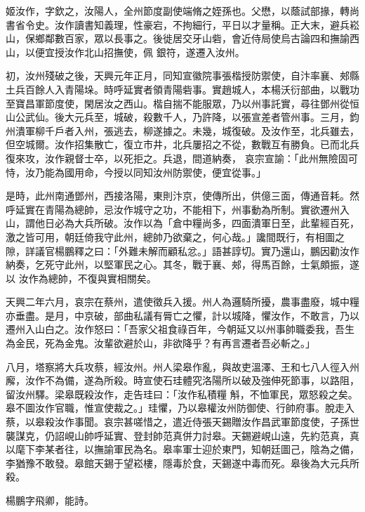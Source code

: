 \begin{pinyinscope}
 姬汝作，字欽之，汝陽人，全州節度副使端脩之姪孫也。父懋，以蔭試部掾，轉尚書省令史。汝作讀書知義理，性豪宕，不拘細行，平日以才量稱。正大末，避兵崧山，保鄉鄰數百家，眾以長事之。後徙居交牙山砦，會近侍局使烏古論四和撫諭西山，以便宜授汝作北山招撫使，佩
 銀符，遂遷入汝州。



 初，汝州殘破之後，天興元年正月，同知宣徽院事張楷授防禦使，自汴率襄、郟縣土兵百餘人入青陽垛。時呼延實者領青陽砦事。實趙城人，本楊沃衍部曲，以戰功至寶昌軍節度使，閑居汝之西山。楷自揣不能服眾，乃以州事託實，尋往鄧州從恒山公武仙。後大元兵至，城破，殺數千人，乃許降，以張宣差者管州事。三月，鈞州潰軍柳千戶者入州，張逃去，柳遂據之。未幾，城復破。及汝作至，北兵雖去，但空城爾。汝作招集散亡，復立市井，北兵屢招之不從，數戰互有勝負。已而北兵復來攻，汝作親督士卒，以死拒之。兵退，間道納奏，
 哀宗宣諭：「此州無險固可恃，汝乃能為國用命，今授以同知汝州防禦使，便宜從事。」



 是時，此州南通鄧州，西接洛陽，東則汴京，使傳所出，供億三面，傳通音耗。然呼延實在青陽為總帥，忌汝作城守之功，不能相下，州事動為所制。實欲遷州入山，謂他日必為大兵所破。汝作以為「倉中糧尚多，四面潰軍日至，此輩經百死，激之皆可用，朝廷倚我守此州，總帥乃欲棄之，何心哉。」讒間既行，有相圖之隙，詳議官楊鵬釋之曰：「外難未解而顧私忿。」語甚諄切。實乃還山，鵬因勸汝作納奏，乞死守此州，以堅軍民之心。其冬，戰于襄、郟，得馬百餘，士氣頗振，遂以
 汝作為總帥，不復與實相關矣。



 天興二年六月，哀宗在蔡州，遣使徵兵入援。州人為邏騎所擾，農事盡廢，城中糧亦垂盡。是月，中京破，部曲私議有脣亡之懼，計以城降，懼汝作，不敢言，乃以遷州入山白之。汝作怒曰：「吾家父祖食祿百年，今朝延又以州事帥職委我，吾生為金民，死為金鬼。汝輩欲避於山，非欲降乎？有再言遷者吾必斬之。」



 八月，塔察將大兵攻蔡，經汝州。州人梁皋作亂，與故吏溫澤、王和七八人徑入州廨，汝作不為備，遂為所殺。時宣使石珪體究洛陽所以破及強伸死節事，以路阻，留汝州驛。梁皋既殺汝作，走告珪曰：「汝作私積糧
 斛，不恤軍民，眾怒殺之矣。皋不圖汝作官職，惟宣使裁之。」珪懼，乃以皋權汝州防御使、行帥府事。脫走入蔡，以皋殺汝作事聞。哀宗甚嗟惜之，遣近侍張天錫贈汝作昌武軍節度使，子孫世襲謀克，仍詔峴山帥呼延實、登封帥范真併力討皋。天錫避峴山遠，先約范真，真以麾下李某者往，以撫諭軍民為名。皋率軍士迎於東門，知朝廷圖己，陰為之備，李猶豫不敢發。皋館天錫于望崧樓，隱毒於食，天錫遂中毒而死。皋後為大元兵所殺。



 楊鵬字飛卿，能詩。




\end{pinyinscope}
